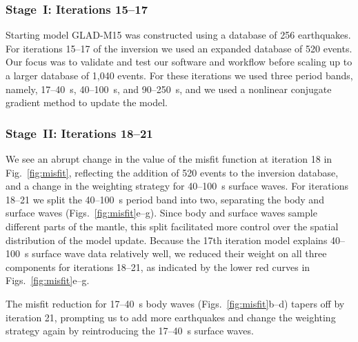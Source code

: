 \documentclass[extra,mreferee]{gji}
\begin{document}
\subsubsection{Stage~I: Iterations 15--17}

Starting model GLAD-M15 was constructed using a database of 256 earthquakes.
For iterations 15--17 of the inversion we used an expanded database of 520 events.
Our focus was to validate and test our software and workflow before scaling up
to a larger database of 1,040 events.
For these iterations we used three period bands, namely,
17--40~s, 40--100~s, and 90--250~s,
and we used a nonlinear conjugate
gradient method to update the model.

\subsubsection{Stage~II: Iterations 18--21}

We see an abrupt change in the value of the misfit function at iteration 18
in Fig.~\ref{fig:misfit},
reflecting the addition of 520 events to the inversion database,
and a change in the weighting strategy for 40--100~s surface waves.
For iterations 18--21 we split the 40--100~s period band into two, separating the body and surface waves (Figs.~\ref{fig:misfit}e--g).
Since body and surface waves sample different parts of the mantle,
this split facilitated more control over the spatial distribution of the model update.
Because the 17th iteration model explains 40--100~s surface wave data relatively well,
we reduced their weight on all three components for iterations 18--21,
as indicated by the lower red curves in Figs.~\ref{fig:misfit}e--g.

The misfit reduction for 17--40~s body waves (Figs.~\ref{fig:misfit}b--d) tapers off by iteration 21, prompting us to add more earthquakes and change the weighting strategy again by reintroducing the 17--40~s surface waves.

\end{document}
